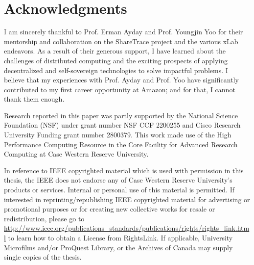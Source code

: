 \section*{Acknowledgments}
I am sincerely thankful to Prof. Erman Ayday and Prof. Youngjin Yoo for their mentorship and collaboration on the ShareTrace project and the various xLab endeavors. As a result of their generous support, I have learned about the challenges of distributed computing and the exciting prospects of applying decentralized and self-sovereign technologies to solve impactful problems. I believe that my experiences with Prof. Ayday and Prof. Yoo have significantly contributed to my first career opportunity at Amazon; and for that, I cannot thank them enough.

Research reported in this paper was partly supported by the National Science Foundation (NSF) under grant number NSF CCF 2200255 and Cisco Research University Funding grant number 2800379. This work made use of the High Performance Computing Resource in the Core Facility for Advanced Research Computing at Case Western Reserve University.

In reference to IEEE copyrighted material which is used with permission in this thesis, the IEEE does not endorse any of Case Western Reserve University’s products or services. Internal or personal use of this material is permitted. If interested in reprinting/republishing IEEE copyrighted material for advertising or promotional purposes or for creating new collective works for resale or redistribution, please go to \url{http://www.ieee.org/publications_standards/publications/rights/rights_link.html} to learn how to obtain a License from RightsLink. If applicable, University Microfilms and/or ProQuest Library, or the Archives of Canada may supply single copies of the thesis.
\clearpage